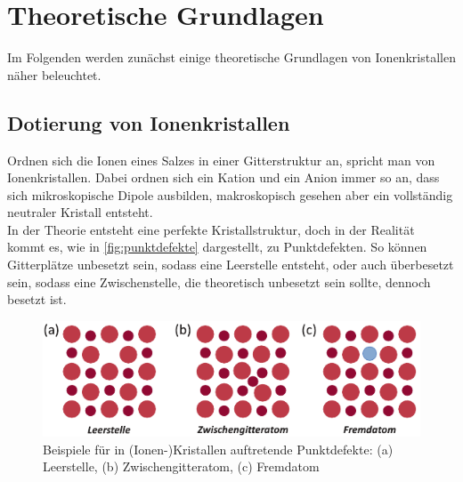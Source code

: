 \section{Theoretische Grundlagen}
\label{sec:theorie}

Im Folgenden werden zunächst einige theoretische Grundlagen von Ionenkristallen näher beleuchtet.

\subsection{Dotierung von Ionenkristallen}

Ordnen sich die Ionen eines Salzes in einer Gitterstruktur an, spricht man von Ionenkristallen. 
Dabei ordnen sich ein Kation und ein Anion immer so an, dass sich mikroskopische Dipole ausbilden, makroskopisch gesehen aber ein vollständig neutraler Kristall entsteht. \\
In der Theorie entsteht eine perfekte Kristallstruktur, doch in der Realität kommt es, wie in \autoref{fig:punktdefekte} dargestellt, zu Punktdefekten.
So können Gitterplätze unbesetzt sein, sodass eine Leerstelle entsteht, oder auch überbesetzt sein, sodass eine Zwischenstelle, die theoretisch unbesetzt sein sollte, dennoch besetzt ist.

\begin{figure}[H]
    \centering
    \includegraphics[]{figures/Fehlstellen.pdf}
    \caption{Beispiele für in (Ionen-)Kristallen auftretende Punktdefekte: (a) Leerstelle, (b) Zwischengitteratom, (c) Fremdatom \cite[S. ~38]{grossmarx}}
    \label{fig:punktdefekte}
\end{figure}

%

